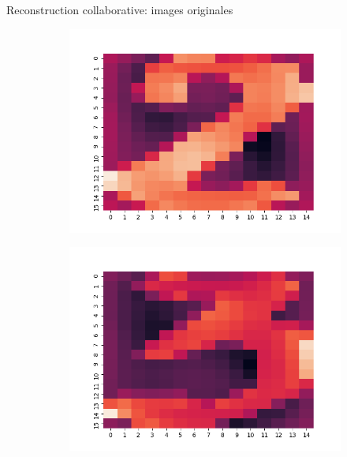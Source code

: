 \documentclass[hyperref={pdfpagelabels=false}]{beamer}
\begin{document}
\begin{frame}{Reconstruction collaborative: images originales}
\begin{figure}[h]
\begin{subfigure}[c]{0.18\textwidth}
                \includegraphics[scale=.12]{o2}
            \end{subfigure}
            \begin{subfigure}[c]{0.18\textwidth}
                \includegraphics[scale=.12]{o3}
            \end{subfigure}
            \begin{subfigure}[c]{0.18\textwidth}

\end{subfigure}
\end{figure}
\end{frame}
\end{document}
